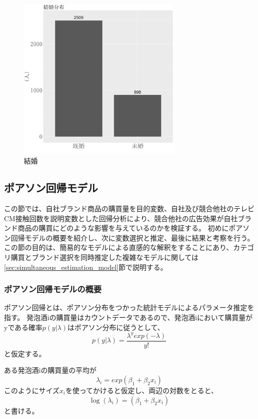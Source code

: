 \documentclass[11pt]{jsarticle}
\begin{document}
\begin{figure}
  \centering
  \includegraphics[width=8cm]{./fig/3-2-2_kekkon.png}
  \caption{結婚}
  \label{fig:consumer_marriage}
 \end{figure}
 
 \newpage
 
\subsection{ポアソン回帰モデル}
\label{sec:poisson}
この節では、自社ブランド商品の購買量を目的変数、自社及び競合他社のテレビCM接触回数を説明変数とした回帰分析により、競合他社の広告効果が自社ブランド商品の購買にどのような影響を与えているのかを検証する。
初めにポアソン回帰モデルの概要を紹介し、次に変数選択と推定、最後に結果と考察を行う。
この節の目的は、簡易的なモデルによる直感的な解釈をすることにあり、カテゴリ購買とブランド選択を同時推定した複雑なモデルに関しては\ref{sec:simultaneous_estimation_model}節で説明する。

\subsubsection{ポアソン回帰モデルの概要}
\label{subsec:poisson_summary}
ポアソン回帰とは、ポアソン分布をつかった統計モデルによるパラメータ推定を指す。
発泡酒iの購買量はカウントデータであるので、発泡酒iにおいて購買量がyである確率$p(y|\lambda)$はポアソン分布に従うとして、
\begin{equation}
 p(y|\lambda) = \frac{\lambda^{y}exp(-\lambda)}{y!}
\end{equation}
と仮定する。

ある発泡酒iの購買量の平均が
\begin{equation}
 \lambda_{i} = exp(\beta_{1} + \beta_{2}x_{i})
\end{equation}
このようにサイズ$x_{i}$を使ってかけると仮定し、両辺の対数をとると、
\begin{equation}
 \log (\lambda_{i}) = (\beta_{1} + \beta_{2}x_{i})
 \end{equation}
と書ける。
\end{document}
